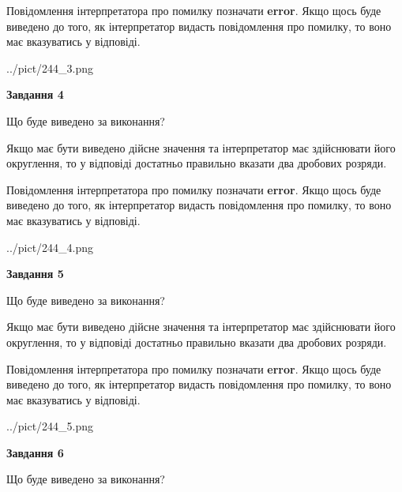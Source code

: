 \documentclass[12pt, ukrainian]{article}
\begin{document}
{\begin {Large}
Повідомлення інтерпретатора про помилку позначати \textbf{error}.
Якщо щось буде виведено до того, як інтерпретатор видасть повідомлення про помилку, 
то воно має вказуватись у відповіді. \par

\begin{center}
	{../pict/244_3.png}
\end{center}
\newpage

{\begin {center}\textbf{Завдання 4}\end {center}}\par
Що буде виведено за виконання? \par

Якщо має бути виведено дійсне значення та інтерпретатор має здійснювати його округлення, 
то у відповіді достатньо правильно вказати два дробових розряди.

Повідомлення інтерпретатора про помилку позначати \textbf{error}.
Якщо щось буде виведено до того, як інтерпретатор видасть повідомлення про помилку, 
то воно має вказуватись у відповіді. \par

\begin{center}
	{../pict/244_4.png}
\end{center}
\newpage

{\begin {center}\textbf{Завдання 5}\end {center}}\par
Що буде виведено за виконання? \par

Якщо має бути виведено дійсне значення та інтерпретатор має здійснювати його округлення, 
то у відповіді достатньо правильно вказати два дробових розряди.

Повідомлення інтерпретатора про помилку позначати \textbf{error}.
Якщо щось буде виведено до того, як інтерпретатор видасть повідомлення про помилку, 
то воно має вказуватись у відповіді. \par

\begin{center}
	{../pict/244_5.png}
\end{center}
\newpage

{\begin {center}\textbf{Завдання 6}\end {center}}\par
Що буде виведено за виконання? \par


\end{Large}}
\end{document}
